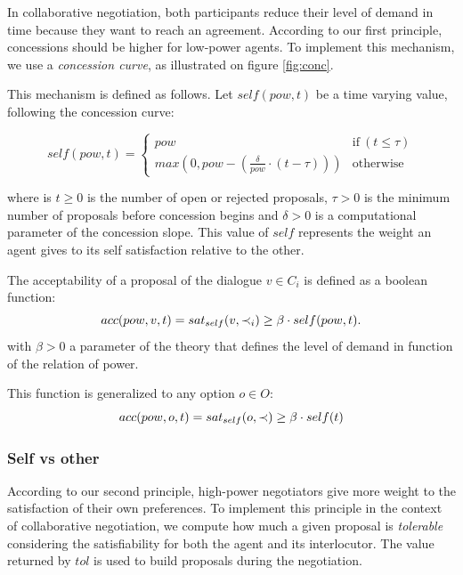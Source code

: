 \documentclass{llncs}
\begin{document}
		In collaborative negotiation, both participants reduce their level of demand in time because they want to reach an agreement.
		According to our first principle, concessions should be higher for low-power agents. To implement this mechanism, we use a \emph{concession curve}, as illustrated on figure \ref{fig:conc}.
		
		This mechanism is defined as follows. Let $self(pow, t)$ be a time varying value, following the concession curve:
		
		\begin{equation}
		self(pow, t) = \left\{\begin{array}{ll}
		pow & \mathrm{if\ } (t \leq \tau)\\
		max(0, pow - (\frac{\delta}{pow} \cdot (t - \tau))) & \mathrm{otherwise}
		\end{array}\right.
		\end{equation}
		
		where is $t \geq 0$ is the number of open or rejected proposals, $\tau > 0$ is the minimum number of proposals before concession begins and $\delta > 0$ is a computational parameter of the concession slope. This value of $self$ represents the weight an agent gives to its self satisfaction relative to the other.
		
		The acceptability of a proposal of the dialogue $v \in C_i$ is defined as a boolean function:
		\vspace{-.5em} 
		\begin{equation}
		\vspace{-.5em} 
		acc(pow,v, t) = sat_{self}(v, \prec_i) \geq  \beta \cdot self(pow,t).
		\end{equation}
		with $\beta>0$ a parameter of the theory that defines the level of demand in function of the relation of power.
		
		This function is generalized to any option $o \in O$:
		\vspace{-.5em} 
		\begin{equation}
		acc(pow,o, t) = sat_{self}(o, \prec) \geq  \beta \cdot self(t)
		\vspace{-1.5em} 
		\end{equation}
		
		\subsubsection {Self vs other}
		According to our second principle, high-power negotiators give more weight to the satisfaction of their own preferences. To implement this principle in the context of collaborative negotiation, we compute how much a given proposal is \emph{tolerable} considering the satisfiability for both the agent and its interlocutor. The value returned by $tol$ is used to build proposals during the negotiation.
		
\end{document}
